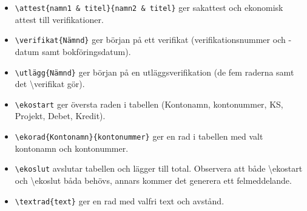 \documentclass[a4paper]{article}
\newcommand{\bs}{\textbackslash}
\begin{document}
\begin{itemize}
\item \texttt{\bs attest\{namn1 \& titel\}\{namn2 \& titel\}} ger sakattest och ekonomisk attest till verifikationer.
\item \texttt{\bs verifikat\{Nämnd\}} ger början på ett verifikat (verifikationsnummer och -datum samt bokföringsdatum).
\item \texttt{\bs utlägg\{Nämnd\}} ger början på en utläggsverifikation (de fem raderna samt det \bs verifikat{} gör).
\item \texttt{\bs ekostart} ger översta raden i tabellen (Kontonamn, kontonummer, KS, Projekt, Debet, Kredit).
\item \texttt{\bs ekorad\{Kontonamn\}\{kontonummer\}} ger en rad i tabellen med valt kontonamn och kontonummer.
\item \texttt{\bs ekoslut} avslutar tabellen och lägger till total. Observera att både \bs ekostart och \bs ekoslut båda behövs, annars kommer det generera ett felmeddelande.
\item \texttt{\bs textrad\{text\}} ger en rad med valfri text och avstånd.
\end{itemize}
\end{document}
